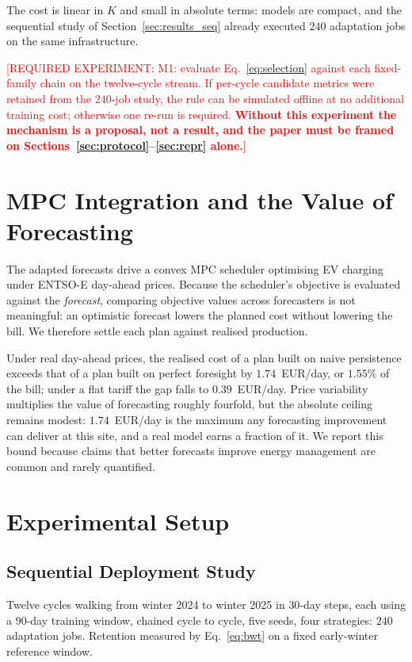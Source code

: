 \documentclass[journal]{IEEEtran}
\newcommand{\needexp}[1]{\textcolor{red}{[REQUIRED EXPERIMENT: #1]}}
\begin{document}
The cost is linear in $K$ and small in absolute terms: models are compact, and
the sequential study of Section~\ref{sec:results_seq} already executed $240$
adaptation jobs on the same infrastructure.

\needexp{M1: evaluate Eq.~\eqref{eq:selection} against each fixed-family chain on
the twelve-cycle stream. If per-cycle candidate metrics were retained from the
$240$-job study, the rule can be simulated offline at no additional training
cost; otherwise one re-run is required. \textbf{Without this experiment the
mechanism is a proposal, not a result, and the paper must be framed on
Sections~\ref{sec:protocol}--\ref{sec:repr} alone.}}

\section{MPC Integration and the Value of Forecasting}
\label{sec:mpc}


The adapted forecasts drive a convex MPC scheduler optimising EV charging under
ENTSO-E day-ahead prices. Because the scheduler's objective is evaluated against
the \emph{forecast}, comparing objective values across forecasters is not
meaningful: an optimistic forecast lowers the planned cost without lowering the
bill. We therefore settle each plan against realised production.

Under real day-ahead prices, the realised cost of a plan built on naive
persistence exceeds that of a plan built on perfect foresight by
$1.74$~EUR/day, or $1.55\%$ of the bill; under a flat tariff the gap falls to
$0.39$~EUR/day. Price variability multiplies the value of forecasting roughly
fourfold, but the absolute ceiling remains modest: $1.74$~EUR/day is the maximum
any forecasting improvement can deliver at this site, and a real model earns a
fraction of it. We report this bound because claims that better forecasts
improve energy management are common and rarely quantified.

\section{Experimental Setup}
\label{sec:setup}

\subsection{Sequential Deployment Study}
Twelve cycles walking from winter 2024 to winter 2025 in $30$-day steps, each
using a $90$-day training window, chained cycle to cycle, five seeds, four
strategies: $240$ adaptation jobs. Retention measured by Eq.~\eqref{eq:bwt} on a
fixed early-winter reference window.
\end{document}
